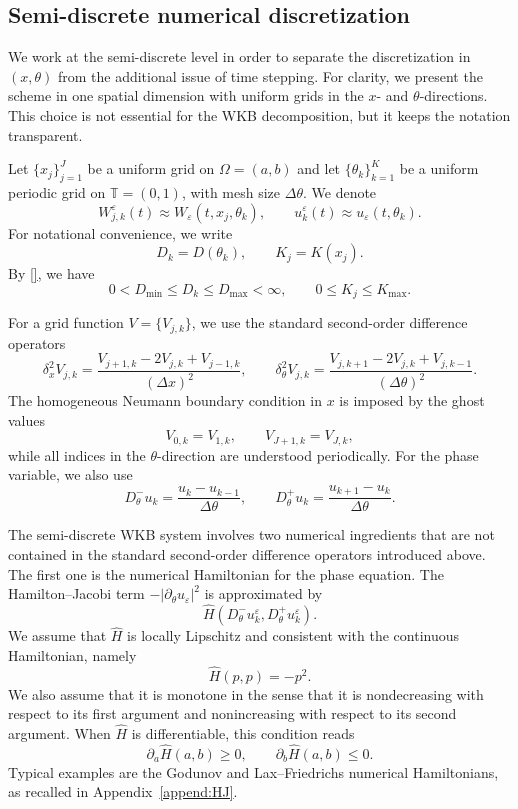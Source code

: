 \documentclass[11pt, dina4, amsfont12]{article}
\begin{document}
\subsection{Semi-discrete numerical discretization}

We work at the semi-discrete level in order to separate the discretization in
\((x,\theta)\) from the additional issue of time stepping. For clarity, we
present the scheme in one spatial dimension with uniform grids in the
\(x\)- and \(\theta\)-directions. This choice is not essential for the WKB
decomposition, but it keeps the notation transparent.

Let \(\{x_j\}_{j=1}^J\) be a uniform grid on \(\Omega=(a,b)\) and let
\(\{\theta_k\}_{k=1}^K\) be a uniform periodic grid on \(\mathbb T=(0,1)\),
with mesh size \(\Delta\theta\). We denote
\[
W_{j,k}^\varepsilon(t)\approx W_\varepsilon(t,x_j,\theta_k),
\qquad
u_k^\varepsilon(t)\approx u_\varepsilon(t,\theta_k).
\]
For notational convenience, we write
\[
D_k=D(\theta_k),
\qquad
K_j=K(x_j).
\]
By \eqref{}, we have 
\[
    0<D_{\min}\le D_k\le D_{\max}<\infty,
    \qquad
    0\le K_j\le K_{\max}.
\]


For a grid function \(V=\{V_{j,k}\}\), we use the standard second-order
difference operators
\[
\delta_x^2 V_{j,k}
=
\frac{V_{j+1,k}-2V_{j,k}+V_{j-1,k}}{(\Delta x)^2},
\qquad
\delta_\theta^2 V_{j,k}
=
\frac{V_{j,k+1}-2V_{j,k}+V_{j,k-1}}{(\Delta\theta)^2}.
\]
The homogeneous Neumann boundary condition in \(x\) is imposed by the ghost
values
\[
V_{0,k}=V_{1,k},
\qquad
V_{J+1,k}=V_{J,k},
\]
while all indices in the \(\theta\)-direction are understood periodically.
For the phase variable, we also use
\[
D_\theta^-u_k
=
\frac{u_k-u_{k-1}}{\Delta\theta},
\qquad
D_\theta^+u_k
=
\frac{u_{k+1}-u_k}{\Delta\theta}.
\]

The semi-discrete WKB system involves two numerical ingredients that are not
contained in the standard second-order difference operators introduced above.
The first one is the numerical Hamiltonian for the phase equation. The
Hamilton--Jacobi term \(-|\partial_\theta u_\varepsilon|^2\) is approximated by
\[
\widehat H(D_\theta^-u_k^\varepsilon,D_\theta^+u_k^\varepsilon).
\]
We assume that \(\widehat H\) is locally Lipschitz and consistent with the
continuous Hamiltonian, namely
\[
\widehat H(p,p)=-p^2 .
\]
We also assume that it is monotone in the sense that it is nondecreasing with
respect to its first argument and nonincreasing with respect to its second
argument. When \(\widehat H\) is differentiable, this condition reads
\[
\partial_a\widehat H(a,b)\ge0,
\qquad
\partial_b\widehat H(a,b)\le0 .
\]
Typical examples are the Godunov and Lax--Friedrichs numerical Hamiltonians,
as recalled in Appendix~\ref{append:HJ}.
\end{document}

